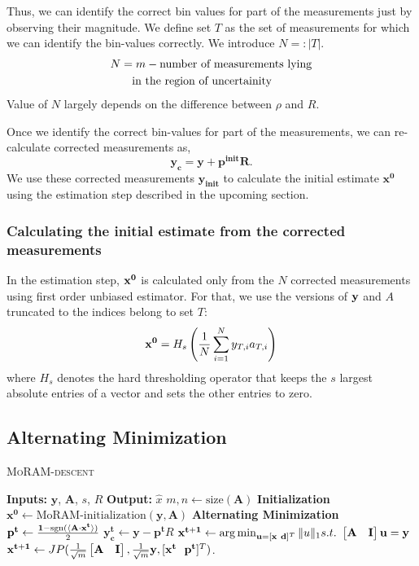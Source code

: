 Thus, we can identify the correct bin values for part of the measurements just by observing their magnitude. We define set $T$ as the set of measurements for which we can identify the bin-values correctly. We introduce $N=:|T|$.
\begin{align*}
N & =  m - \textnormal{number of measurements lying} \\
&~~~\textnormal{in the region of uncertainity}
\end{align*}
Value of $N$ largely depends on the difference between $\rho$ and $R$.

Once we identify the correct bin-values for part of the measurements, we can re-calculate corrected measurements as,
$$
\mathbf{y_{c} = y + p^{init}R}.
$$
We use these corrected measurements $\mathbf{y_{init}}$ to calculate the initial estimate $\mathbf{{x}^0}$ using the estimation step described in the upcoming section.
\subsubsection{Calculating the initial estimate from the corrected measurements}
In the estimation step, $\mathbf{x^0}$ is calculated only from the $N$ corrected measurements using first order unbiased estimator. For that, we use the versions of $\mathbf{y}$ and $A$ truncated to the indices belong to set $T$:
\begin{equation}
\mb{x^0} = H_s\left( \frac{1}{N}\sum_{i=1}^{N}y_{T,i}a_{T,i}\right)
\label{eq:init}
\end{equation}
where $H_s$ denotes the hard thresholding operator that keeps the $s$ largest absolute entries of a vector and sets the other entries to zero.
\subsection{Alternating Minimization}
\label{sec:altmin}
\begin{algorithm}[H]
	\caption{\textsc{MoRAM-descent}}
	\label{alg:MoRAM}
	\begin{algorithmic}
		\State\textbf{Inputs:} $\mathbf{y}$, $\mathbf{A}$, $s$, $R$
		\State\textbf{Output:}  $\widehat{x}$
		\State $m,n \leftarrow \mathrm{size}(\mathbf{A})$ 
		\State \textbf{Initialization}
		\State $\mathbf{x^0} \leftarrow \textrm{MoRAM-initialization}(\mathbf{y, A})$ 
		\State \textbf{Alternating Minimization}
		\State $\mathbf{{p}^{t}} \leftarrow \frac{\mathbf{1}-\mathrm{sgn}(\langle \mathbf{A} \cdot \mathbf{x^t} \rangle)}{2}$
		\State $\mathbf{y^t_c} \leftarrow \mathbf{y} - \mathbf{p^t}R$
		\State $\mathbf{{x}^{t+1}}\leftarrow \operatorname*{arg\,min}_{\mathbf{u}=[\mathbf{x~d}]^T}\|u\|_1  s.t.~ \begin{bmatrix} \mathbf{A} & \mathbf{I} \end{bmatrix}\mathbf{u} = \mathbf{y}$ 
		\State $\mathbf{{x}^{t+1}}\leftarrow \small{JP(\frac{1}{\sqrt{m}}\begin{bmatrix} \mathbf{A} & \mathbf{I} \end{bmatrix},\frac{1}{\sqrt{m}}\mathbf{y},[\mathbf{x^t~~p^t}]^T)}$.
		\EndFor
	\end{algorithmic}
\end{algorithm}


